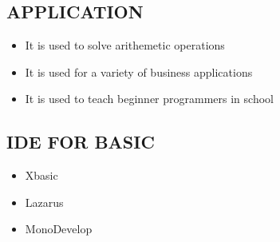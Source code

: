 \documentclass{article}
\begin{document}
\subsection{APPLICATION}
\begin{itemize}
	\item It is used to solve arithemetic operations
	\item It is used for a variety of business applications
	\item It is used to teach beginner programmers in school 
\end{itemize}

\subsection{IDE FOR BASIC}
\begin{itemize}
	\item Xbasic
	\item Lazarus
	\item MonoDevelop
\end{itemize}
\end{document}
